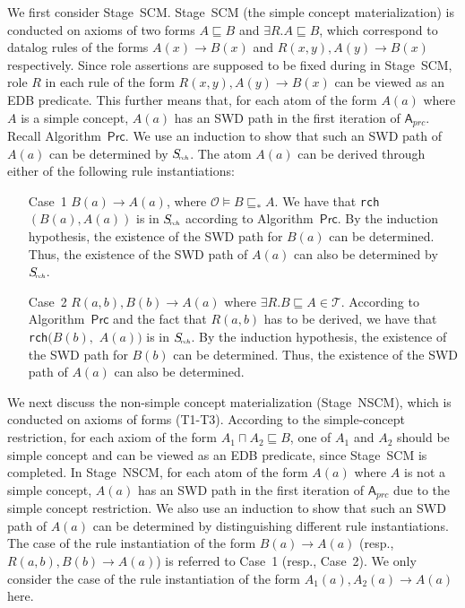 We first consider Stage~SCM.
Stage~SCM (the simple concept materialization) is conducted on axioms of two forms $A\sqsubseteq B$
and $\exists R.A\sqsubseteq B$, which correspond to datalog rules of the forms $A(x)\rightarrow B(x)$
and $R(x,y),A(y)\rightarrow B(x)$ respectively. Since role assertions are supposed to be fixed
during in Stage~SCM, role $R$ in each rule of the form $R(x,y),A(y)\rightarrow B(x)$
can be viewed as an EDB predicate. This further means that,
for each atom of the form $A(a)$ where $A$ is a simple concept,
$A(a)$ has an SWD path in the first iteration of $\mathsf{A}_{prc}$.
Recall Algorithm~$\mathsf{Prc}$. We use an induction to show that
such an SWD path of $A(a)$ can be determined by $S_{\textit{\!\tiny rch}}$.
The atom $A(a)$ can be derived through either of the following rule instantiations:

\begin{enumerate}[leftmargin=12ex]
\item[Case~1] $B(a)\rightarrow A(a)$, where $\mathcal{O}\models B\sqsubseteq_* A$. We have
    that \texttt{rch}$(B(a),A(a))$ is in $S_{\textit{\!\tiny rch}}$ according to Algorithm~$\mathsf{Prc}$.
    By the induction hypothesis, the existence of the SWD path for $B(a)$ can be determined.
    Thus, the existence of the SWD path of $A(a)$ can also be determined by $S_{\textit{\!\tiny rch}}$.

\item[Case~2] $R(a,b),B(b)\rightarrow A(a)$ where $\exists R.B\sqsubseteq A\in\mathcal{T}$.
    According to Algorithm~$\mathsf{Prc}$ and the fact that $R(a,b)$ has to be derived,
    we have that \texttt{rch}$(B(b),$ $A(a))$ is in $S_{\textit{\!\tiny rch}}$.
    By the induction hypothesis, the existence of the SWD path for $B(b)$ can be determined.
    Thus, the existence of the SWD path of $A(a)$ can also be determined.
\end{enumerate}

We next discuss the non-simple concept materialization (Stage~NSCM), which is conducted on axioms of forms (T1-T3).
According to the simple-concept restriction, for each axiom of the form $A_1\sqcap A_2\sqsubseteq B$,
one of $A_1$ and $A_2$ should be simple concept and can be viewed as an EDB predicate, since Stage~SCM is completed.
In Stage~NSCM, for each atom of the form $A(a)$ where $A$ is not a simple concept,
$A(a)$ has an SWD path in the first iteration of $\mathsf{A}_{prc}$ due to the simple concept restriction.
We also use an induction to show that
such an SWD path of $A(a)$ can be determined by distinguishing different rule instantiations.
The case of the rule instantiation of the form $B(a)\rightarrow A(a)$ (resp., $R(a,b),B(b)\rightarrow A(a)$)
is referred to Case~1 (resp., Case~2). We only consider the case of the rule instantiation of the form $A_1(a),A_2(a)\rightarrow A(a)$
here.


